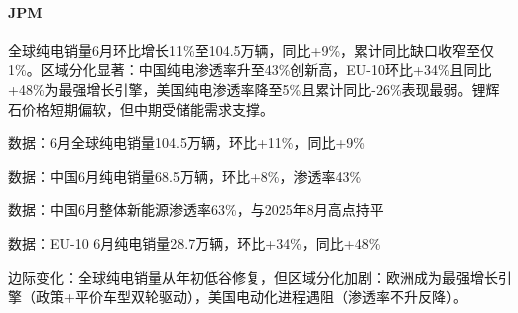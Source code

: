 \documentclass[11pt]{ctexart}
\begin{document}
\paragraph{JPM} 全球纯电销量6月环比增长11\%至104.5万辆，同比+9\%，累计同比缺口收窄至仅1\%。区域分化显著：中国纯电渗透率升至43\%创新高，EU-10环比+34\%且同比+48\%为最强增长引擎，美国纯电渗透率降至5\%且累计同比-26\%表现最弱。锂辉石价格短期偏软，但中期受储能需求支撑。
{\small\color{refgray}数据：6月全球纯电销量104.5万辆，环比+11\%，同比+9\%\par}
{\small\color{refgray}数据：中国6月纯电销量68.5万辆，环比+8\%，渗透率43\%\par}
{\small\color{refgray}数据：中国6月整体新能源渗透率63\%，与2025年8月高点持平\par}
{\small\color{refgray}数据：EU-10 6月纯电销量28.7万辆，环比+34\%，同比+48\%\par}
{\small\color{refgray}边际变化：全球纯电销量从年初低谷修复，但区域分化加剧：欧洲成为最强增长引擎（政策+平价车型双轮驱动），美国电动化进程遇阻（渗透率不升反降）。\par}
\end{document}
